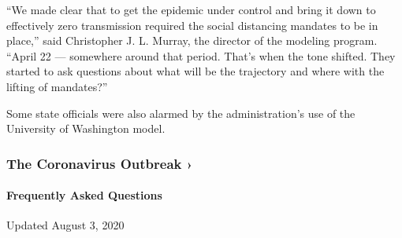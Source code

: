 ``We made clear that to get the epidemic under control and bring it down
to effectively zero transmission required the social distancing mandates
to be in place,'' said Christopher J. L. Murray, the director of the
modeling program. ``April 22 --- somewhere around that period. That's
when the tone shifted. They started to ask questions about what will be
the trajectory and where with the lifting of mandates?''

Some state officials were also alarmed by the administration's use of
the University of Washington model.

\href{https://www.nytimes3xbfgragh.onion/news-event/coronavirus?action=click\&pgtype=Article\&state=default\&region=MAIN_CONTENT_3\&context=storylines_faq}{}

\hypertarget{the-coronavirus-outbreak-}{%
\subsubsection{The Coronavirus Outbreak
›}\label{the-coronavirus-outbreak-}}

\hypertarget{frequently-asked-questions}{%
\paragraph{Frequently Asked
Questions}\label{frequently-asked-questions}}

Updated August 3, 2020

